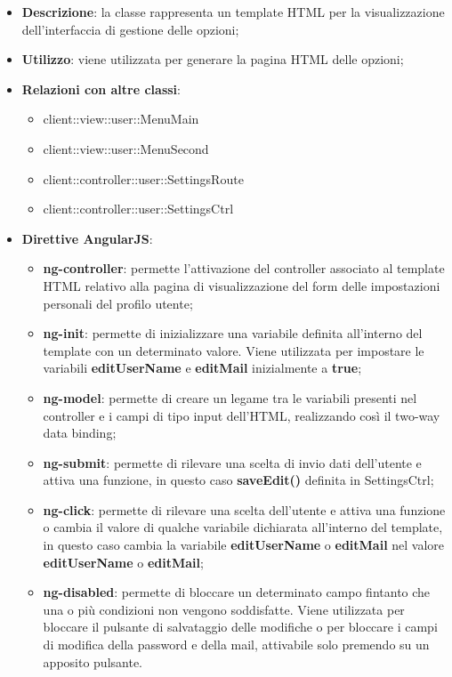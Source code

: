 			\begin{itemize}
				\item \textbf{Descrizione}: la classe rappresenta un template HTML per la visualizzazione dell'interfaccia di gestione delle opzioni;
				\item \textbf{Utilizzo}: viene utilizzata per generare la pagina HTML delle opzioni;
				\item \textbf{Relazioni con altre classi}:
					\begin{itemize}
						\item client::view::user::MenuMain
						\item client::view::user::MenuSecond
						\item client::controller::user::SettingsRoute
						\item client::controller::user::SettingsCtrl
					\end{itemize}
				\item \textbf{Direttive AngularJS}:
					\begin{itemize}
						\item \textbf{ng-controller}: permette l'attivazione del controller associato al template HTML relativo alla pagina di visualizzazione del form delle impostazioni personali del profilo utente;
						\item \textbf{ng-init}: permette di inizializzare una variabile definita all'interno del template con un determinato valore. Viene utilizzata per impostare le variabili \textbf{editUserName} e \textbf{editMail} inizialmente a \textbf{true};
						\item \textbf{ng-model}: permette di creare un legame tra le variabili presenti nel controller e i campi di tipo input dell'HTML, realizzando così il two-way data binding;
						\item \textbf{ng-submit}: permette di rilevare una scelta di invio dati dell'utente e attiva una funzione, in questo caso \textbf{saveEdit()} definita in SettingsCtrl;
						\item \textbf{ng-click}: permette di rilevare una scelta dell'utente e attiva una funzione o cambia il valore di qualche variabile dichiarata all'interno del template, in questo caso cambia la variabile \textbf{editUserName} o \textbf{editMail} nel valore \textbf{editUserName} o \textbf{editMail};
						\item \textbf{ng-disabled}: permette di bloccare un determinato campo fintanto che una o più condizioni non vengono soddisfatte. Viene utilizzata per bloccare il pulsante di salvataggio delle modifiche o per bloccare i campi di modifica della password e della mail, attivabile solo premendo su un apposito pulsante.
					\end{itemize}
			\end{itemize}

